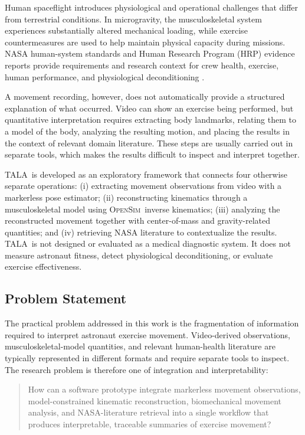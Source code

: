 \documentclass[11pt,a4paper]{article}
\newcommand{\TALA}{\textsc{TALA}}
\newcommand{\OpenSim}{\textsc{OpenSim}}
\begin{document}
Human spaceflight introduces physiological and operational challenges that differ from terrestrial conditions. In microgravity, the musculoskeletal system experiences substantially altered mechanical loading, while exercise countermeasures are used to help maintain physical capacity during missions. NASA human-system standards and Human Research Program (HRP) evidence reports provide requirements and research context for crew health, exercise, human performance, and physiological deconditioning \cite{nasa_std1,nasa_std2,hrp_fitness,ochmo_exercise}.

A movement recording, however, does not automatically provide a structured explanation of what occurred. Video can show an exercise being performed, but quantitative interpretation requires extracting body landmarks, relating them to a model of the body, analyzing the resulting motion, and placing the results in the context of relevant domain literature. These steps are usually carried out in separate tools, which makes the results difficult to inspect and interpret together.

\TALA\ is developed as an exploratory framework that connects four otherwise separate operations: (i) extracting movement observations from video with a markerless pose estimator; (ii) reconstructing kinematics through a musculoskeletal model using \OpenSim\ inverse kinematics; (iii) analyzing the reconstructed movement together with center-of-mass and gravity-related quantities; and (iv) retrieving NASA literature to contextualize the results. \TALA\ is not designed or evaluated as a medical diagnostic system. It does not measure astronaut fitness, detect physiological deconditioning, or evaluate exercise effectiveness.

\subsection{Problem Statement}

The practical problem addressed in this work is the fragmentation of information required to interpret astronaut exercise movement. Video-derived observations, musculoskeletal-model quantities, and relevant human-health literature are typically represented in different formats and require separate tools to inspect. The research problem is therefore one of integration and interpretability:

\begin{quote}
How can a software prototype integrate markerless movement observations, model-constrained kinematic reconstruction, biomechanical movement analysis, and NASA-literature retrieval into a single workflow that produces interpretable, traceable summaries of exercise movement?
\end{quote}
\end{document}
